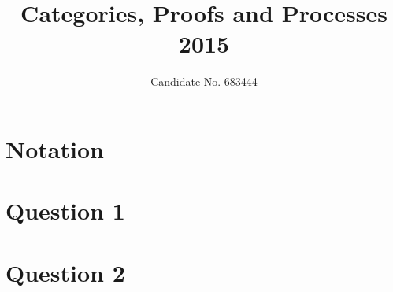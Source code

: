 \documentclass{tufte-handout}
\title{Categories, Proofs and Processes 2015}
\author{Candidate No. 683444}
\theoremstyle{definition}
\numberwithin{definition}{section}
\theoremstyle{plain}
\numberwithin{prop}{section}
\theoremstyle{plain}
\numberwithin{lemma}{section}
\begin{document}
\maketitle

\section{Notation}\label{sec:notation}


\section{Question 1}\label{sec:q-1}


\section{Question 2}\label{sec:q-2}

\end{document}
